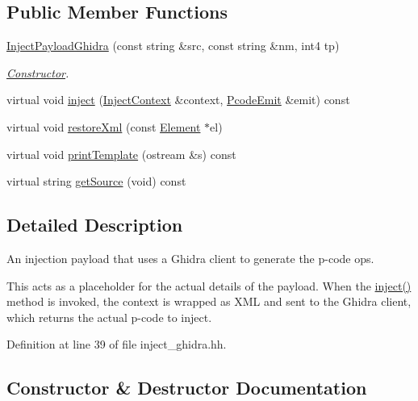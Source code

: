 \subsection*{Public Member Functions}
\begin{DoxyCompactItemize}
\item 
\mbox{\hyperlink{class_inject_payload_ghidra_a1b02c1c3a5a9ebbdaf4ab68506cd8374}{Inject\+Payload\+Ghidra}} (const string \&src, const string \&nm, int4 tp)
\begin{DoxyCompactList}\small\item\em \mbox{\hyperlink{class_constructor}{Constructor}}. \end{DoxyCompactList}\item 
virtual void \mbox{\hyperlink{class_inject_payload_ghidra_ad6f4913cfcdd2eaf229a45150802250c}{inject}} (\mbox{\hyperlink{class_inject_context}{Inject\+Context}} \&context, \mbox{\hyperlink{class_pcode_emit}{Pcode\+Emit}} \&emit) const
\item 
virtual void \mbox{\hyperlink{class_inject_payload_ghidra_a5ccd974310decec0bdb6985f89c0f0ed}{restore\+Xml}} (const \mbox{\hyperlink{class_element}{Element}} $\ast$el)
\item 
virtual void \mbox{\hyperlink{class_inject_payload_ghidra_a7eb6bd1257e562d6b51cf824948c7a33}{print\+Template}} (ostream \&s) const
\item 
virtual string \mbox{\hyperlink{class_inject_payload_ghidra_a711ab66b629aec4c756751bd737c7580}{get\+Source}} (void) const
\end{DoxyCompactItemize}


\subsection{Detailed Description}
An injection payload that uses a Ghidra client to generate the p-\/code ops. 

This acts as a placeholder for the actual details of the payload. When the \mbox{\hyperlink{class_inject_payload_ghidra_ad6f4913cfcdd2eaf229a45150802250c}{inject()}} method is invoked, the context is wrapped as X\+ML and sent to the Ghidra client, which returns the actual p-\/code to inject. 

Definition at line 39 of file inject\+\_\+ghidra.\+hh.



\subsection{Constructor \& Destructor Documentation}
\mbox{\label{class_inject_payload_ghidra_a1b02c1c3a5a9ebbdaf4ab68506cd8374}} 
